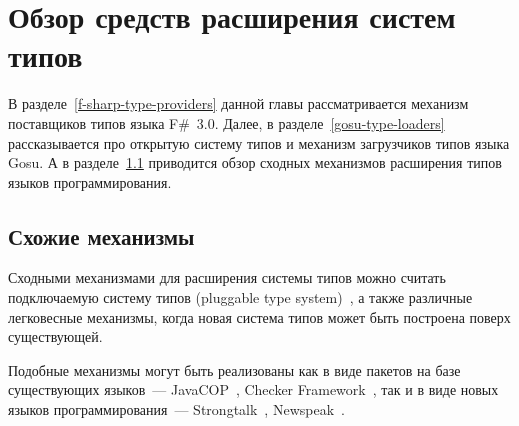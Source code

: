 \section{Обзор средств расширения систем типов}
В разделе~\ref{f-sharp-type-providers} данной главы рассматривается механизм поставщиков типов языка F\#~3.0. Далее, в разделе~\ref{gosu-type-loaders} рассказывается про открытую систему типов и механизм загрузчиков типов языка Gosu. А в разделе~\ref{similar-mechanisms} приводится обзор сходных механизмов расширения типов языков программирования.




\subsection{Схожие механизмы}\label{similar-mechanisms}
Сходными механизмами для расширения системы типов можно считать подключаемую систему типов (pluggable type system)~\cite{bracha}, а также различные легковесные механизмы, когда новая система типов может быть построена поверх существующей.

Подобные механизмы могут быть реализованы как в виде пакетов на базе существующих языков~--- JavaCOP~\cite{javacop2010}, Checker Framework~\cite{checkerframework2008},
так и в виде новых языков программирования~--- Strongtalk~\cite{strongtalk1993}, Newspeak~\cite{newspeak2008}.
